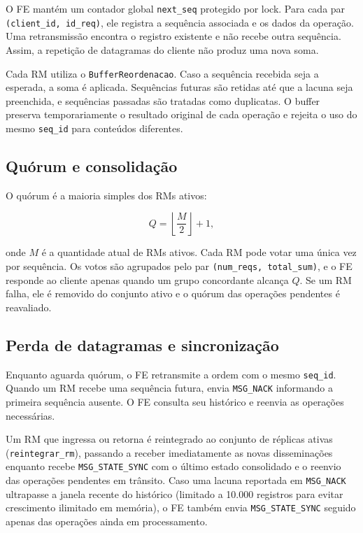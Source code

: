 \documentclass[12pt,a4paper]{article}
\newcommand{\arquivo}[1]{\texttt{#1}}
\newcommand{\mensagem}[1]{\texttt{#1}}
\begin{document}
O FE mantém um contador global \arquivo{next\_seq} protegido por lock. Para cada
par \arquivo{(client\_id, id\_req)}, ele registra a sequência associada e os
dados da operação. Uma retransmissão encontra o registro existente e não recebe
outra sequência. Assim, a repetição de datagramas do cliente não produz uma nova
soma.

Cada RM utiliza o \arquivo{BufferReordenacao}. Caso a sequência recebida seja a
esperada, a soma é aplicada. Sequências futuras são retidas até que a lacuna
seja preenchida, e sequências passadas são tratadas como duplicatas. O buffer
preserva temporariamente o resultado original de cada operação e rejeita o uso
do mesmo \arquivo{seq\_id} para conteúdos diferentes.

\subsection{Quórum e consolidação}

O quórum é a maioria simples dos RMs ativos:

\[
    Q = \left\lfloor\frac{M}{2}\right\rfloor + 1,
\]

onde $M$ é a quantidade atual de RMs ativos. Cada RM pode votar uma única vez
por sequência. Os votos são agrupados pelo par
\arquivo{(num\_reqs, total\_sum)}, e o FE responde ao cliente apenas quando um
grupo concordante alcança $Q$. Se um RM falha, ele é removido do conjunto ativo
e o quórum das operações pendentes é reavaliado.

\subsection{Perda de datagramas e sincronização}

Enquanto aguarda quórum, o FE retransmite a ordem com o mesmo
\arquivo{seq\_id}. Quando um RM recebe uma sequência futura, envia
\mensagem{MSG\_NACK} informando a primeira sequência ausente. O FE consulta seu
histórico e reenvia as operações necessárias.

Um RM que ingressa ou retorna é reintegrado ao conjunto de réplicas
ativas (\arquivo{reintegrar\_rm}), passando a receber imediatamente as novas
disseminações enquanto recebe \mensagem{MSG\_STATE\_SYNC} com o último estado
consolidado e o reenvio das operações pendentes em trânsito. Caso uma lacuna
reportada em \mensagem{MSG\_NACK} ultrapasse a janela recente do histórico
(limitado a 10.000 registros para evitar crescimento ilimitado em memória), o FE
também envia \mensagem{MSG\_STATE\_SYNC} seguido apenas das operações ainda em
processamento.
\end{document}

